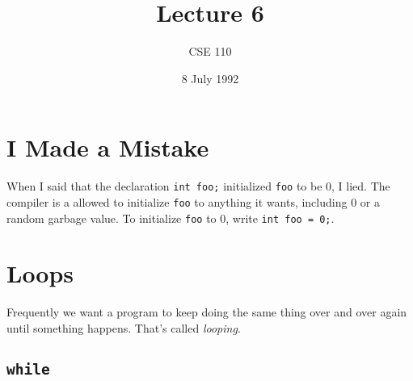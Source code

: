 %
%
%


\def\brac#1{$<$#1$>$}
\def\Int{{\tt int}}
\def\int{\brac{\Int}}
\def\int{\brac{\Int}}
\def\Shortint{{\tt short~int}}
\def\shortint{\brac{\Shortint}}
\def\Longint{{\tt long~int}}
\def\longint{\brac{\Longint}}
\def\Float{{\tt float}}
\def\float{\brac{\Float}}
\def\Double{{\tt double}}
\def\double{\brac{\Double}}
\def\Char{{\tt char}}
\def\chr{\brac{\Char}}
\def\Void{{\tt void}}
\def\void{\brac{\Void}}

\def\p2#1{\brac{pointer~to #1}}

\parskip 8pt


\title{Lecture 6}
\author{CSE 110}
\date{8 July 1992}

\pagestyle{fancy}
\rhead{\thepage}
\cfoot{}





\maketitle

\section{I Made a Mistake}

When I said that the declaration {\tt int foo;} initialized {\tt foo} to
be 0, I lied.  The compiler is a allowed to initialize {\tt foo} to
anything it wants, including 0 or a random garbage value.  To initialize
{\tt foo} to 0, write {\tt int foo = 0;}.  

\section{Loops}

Frequently we want a program to keep doing the same thing over and over
again until something happens.  That's called {\em looping}\/.

\subsection{{\tt while}}

